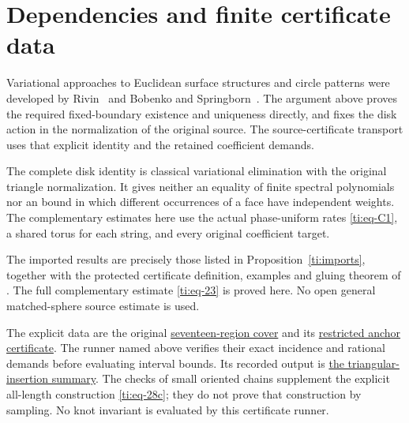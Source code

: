 \documentclass[11pt]{article}
\numberwithin{equation}{section}
\theoremstyle{definition}\newtheorem{definition}[theorem]{Definition}
\theoremstyle{remark}\newtheorem{remark}[theorem]{Remark}
\begin{document}
\section{Dependencies and finite certificate data}\label{ti:sec-9}

Variational approaches to Euclidean surface structures and circle patterns were developed by Rivin~\cite{Rivin1994} and Bobenko and Springborn~\cite{BobenkoSpringborn2004}. The argument above proves the required fixed-boundary existence and uniqueness directly, and fixes the disk action in the normalization of the original source. The source-certificate transport uses that explicit identity and the retained coefficient demands.

The complete disk identity is classical variational elimination with the original triangle normalization. It gives neither an equality of finite spectral polynomials nor an bound in which different occurrences of a face have independent weights. The complementary estimates here use the actual phase-uniform rates \eqref{ti:eq-C1}, a shared torus for each string, and every original coefficient target.

The imported results are precisely those listed in
Proposition~\ref{ti:imports}, together with the protected certificate
definition, examples and gluing theorem of \cite{Planar}. The full
complementary estimate \eqref{ti:eq-23} is proved here. No open general
matched-sphere source estimate is used.

The explicit data are the original
\href{https://github.com/sashakolpakov/murakamis_dream/blob/main/experiments/actual_sector_cover_certificate.json}{seventeen-region cover}
and its
\href{https://github.com/sashakolpakov/murakamis_dream/blob/main/experiments/actual_shared_radius_anchor_obstruction_certificate.json}{restricted anchor certificate}.
The runner named above verifies their exact incidence and rational
demands before evaluating interval bounds. Its recorded output is
\href{https://github.com/sashakolpakov/murakamis_dream/blob/main/repro/triangular-boundary-insertion/summary.json}{the triangular-insertion summary}.
The checks of small oriented chains supplement the explicit all-length
construction \eqref{ti:eq-28c}; they do not prove that construction by
sampling. No knot invariant is evaluated by this certificate runner.
\end{document}
